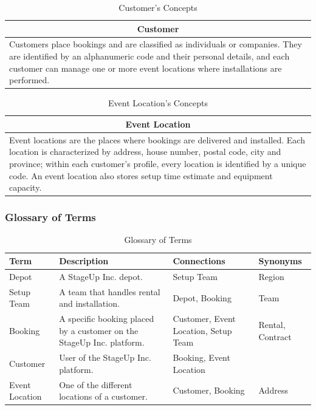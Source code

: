 \begin{table}[H]
    \renewcommand{\arraystretch}{1.25}
    \begin{tabularx}{\textwidth}{|X|}
    \hline
    \multicolumn{1}{|c|}{\textbf{Customer}} \\
    \hline
    Customers place bookings and are classified as individuals or companies. They are identified by an alphanumeric code and their personal details, and each customer can manage one or more event locations where installations are performed. \\
    \hline
    \end{tabularx}
    \caption{Customer's Concepts}
\end{table}

\begin{table}[H]
    \renewcommand{\arraystretch}{1.25}
    \begin{tabularx}{\textwidth}{|X|}
    \hline
    \multicolumn{1}{|c|}{\textbf{Event Location}} \\
    \hline
    Event locations are the places where bookings are delivered and installed. Each location is characterized by address, house number, postal code, city and province; within each customer's profile, every location is identified by a unique code. An event location also stores setup time estimate and equipment capacity. \\
    \hline
    \end{tabularx}
    \caption{Event Location's Concepts}
\end{table}

\subsubsection{Glossary of Terms}

\begin{table}[H]
    \renewcommand{\arraystretch}{1.25}
    \begin{tabularx}{\textwidth}{|X|X|X|X|}
    \hline
    \textbf{Term} & \textbf{Description} & \textbf{Connections} & \textbf{Synonyms} \\
    \hline
    Depot & A StageUp Inc. depot. & Setup Team & Region \\
    \hline
    Setup Team & A team that handles rental and installation. & Depot, Booking & Team \\
    \hline
    Booking & A specific booking placed by a customer on the StageUp Inc. platform. & Customer, Event Location, Setup Team & Rental, Contract \\
    \hline
    Customer & User of the StageUp Inc. platform. & Booking, Event Location & \\
    \hline
    Event Location & One of the different locations of a customer. & Customer, Booking & Address \\
    \hline
    \end{tabularx}
    \caption{Glossary of Terms}
\end{table}

